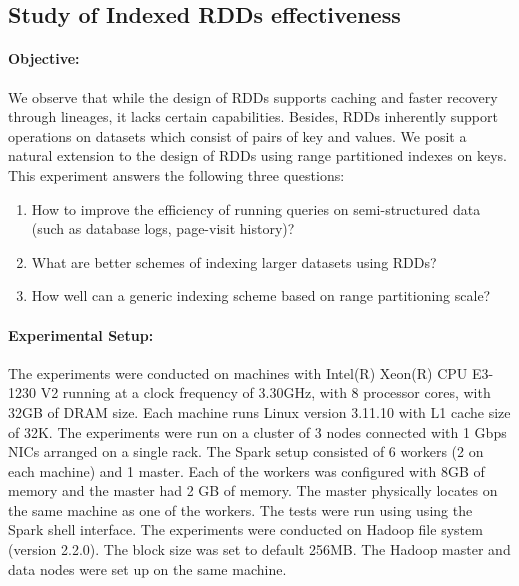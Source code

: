 \subsection{Study of Indexed RDDs effectiveness}
\paragraph{Objective:} We observe that while the design of RDDs supports
caching and faster recovery through lineages, it lacks certain
capabilities. Besides, RDDs inherently support operations on datasets
which consist of pairs of key and values. We posit a natural extension
to the design of RDDs using range partitioned indexes on keys. This
experiment answers the following three questions:

\begin{enumerate}
\item How to improve the efficiency of running queries on
    semi-structured data (such as database logs, page-visit history)? 
\item What are better schemes of indexing larger datasets using RDDs?
\item How well can a generic indexing scheme based on range partitioning
    scale? 
\end{enumerate}

\paragraph{Experimental Setup:} The experiments were conducted on
machines with Intel(R) Xeon(R) CPU E3-1230 V2 running at a clock
frequency of 3.30GHz, with 8 processor cores, with 32GB of DRAM size.
Each machine runs Linux version 3.11.10 with L1 cache size of 32K.  The
experiments were run on a cluster of 3 nodes connected with 1 Gbps NICs
arranged on a single rack. The Spark setup consisted of 6 workers (2 on
each machine) and 1 master. Each of the workers was configured with 8GB
of memory and the master had 2 GB of memory.  The master physically
locates on the same machine as one of the workers. The tests were run
using using the Spark shell interface.  The experiments were conducted
on Hadoop file system (version 2.2.0).  The block size was set to
default 256MB. The Hadoop master and data nodes were set up on the same
machine.

